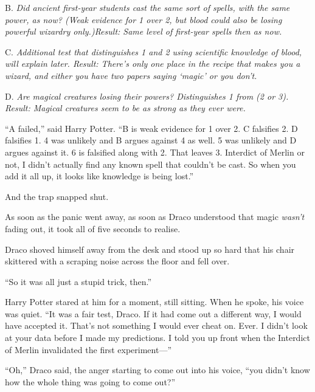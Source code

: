 B. \emph{Did ancient first-year students cast the same sort of spells,
with the same power, as now? (Weak evidence for 1 over 2, but blood
could also be losing powerful wizardry only.)Result: Same level of
first-year spells then as now.}

C. \emph{Additional test that distinguishes 1 and 2 using scientific
knowledge of blood, will explain later. Result: There's only one place
in the recipe that makes you a wizard, and either you have two papers
saying `magic' or you don't.}

D. \emph{Are magical creatures losing their powers? Distinguishes 1 from
(2 or 3). Result: Magical creatures seem to be as strong as they ever
were.}

``A failed,'' said Harry Potter. ``B is weak evidence for 1 over 2. C
falsifies 2. D falsifies 1. 4 was unlikely and B argues against 4 as
well. 5 was unlikely and D argues against it. 6 is falsified along with
2. That leaves 3. Interdict of Merlin or not, I didn't actually find any
known spell that couldn't be cast. So when you add it all up, it looks
like knowledge is being lost.''

And the trap snapped shut.

As soon as the panic went away, as soon as Draco understood that magic
\emph{wasn't} fading out, it took all of five seconds to realise.

Draco shoved himself away from the desk and stood up so hard that his
chair skittered with a scraping noise across the floor and fell over.

``So it was all just a stupid trick, then.''

Harry Potter stared at him for a moment, still sitting. When he spoke,
his voice was quiet. ``It was a fair test, Draco. If it had come out a
different way, I would have accepted it. That's not something I would
ever cheat on. Ever. I didn't look at your data before I made my
predictions. I told you up front when the Interdict of Merlin
invalidated the first experiment---''

``Oh,'' Draco said, the anger starting to come out into his voice, ``you
didn't know how the whole thing was going to come out?''

